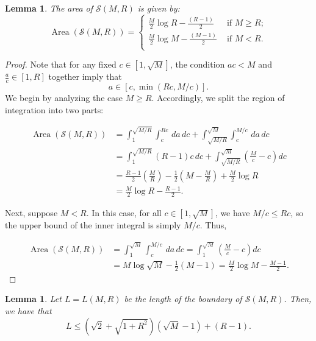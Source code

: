 \documentclass[table]{amsart}
\newtheorem{lemma}[theorem]{Lemma}
\newcommand{\op}[1]{\operatorname{#1}}
\numberwithin{equation}{section}
\begin{document}
\begin{lemma}\label{S(M,R) area lemma}
    The area of $\mathcal{S}(M, R)$ is given by: \[
\op{Area}\left(\mathcal{S}(M, R)\right)=\begin{cases}
 \frac{M}{2}\log R -\frac{(R-1)}{2} &\text{ if }M\geq R;\\
 \frac{M}{2}\log M-\frac{(M-1)}{2} & \text{ if }M<R.\\
\end{cases}\]
\end{lemma}
\begin{proof}Note that for any fixed $c \in [1, \sqrt{M}]$, the condition $ac < M$ and $\frac{a}{c} \in [1, R]$ together imply that
\[a \in \left[c, \min(Rc, M/c)\right].\]
\noindent We begin by analyzing the case $M \geq R$. Accordingly, we split the region of integration into two parts:

$$
\begin{aligned}
\operatorname{Area}(\mathcal{S}(M, R)) &= \int_{1}^{\sqrt{M/R}} \int_{c}^{Rc} \, da\, dc + \int_{\sqrt{M/R}}^{\sqrt{M}} \int_{c}^{M/c} \, da\, dc \\
&= \int_{1}^{\sqrt{M/R}} (R - 1)c \, dc + \int_{\sqrt{M/R}}^{\sqrt{M}} \left( \frac{M}{c} - c \right) dc \\
&= \frac{R - 1}{2} \left(\frac{M}{R}\right) - \frac{1}{2}\left(M - \frac{M}{R}\right) + \frac{M}{2} \log R \\
&= \frac{M}{2} \log R - \frac{R - 1}{2}.
\end{aligned}
$$

Next, suppose $M < R$. In this case, for all $c \in [1, \sqrt{M}]$, we have $M/c \leq Rc$, so the upper bound of the inner integral is simply $M/c$. Thus,

$$
\begin{aligned}
\operatorname{Area}(\mathcal{S}(M, R)) &= \int_{1}^{\sqrt{M}} \int_{c}^{M/c} \, da\, dc = \int_{1}^{\sqrt{M}} \left( \frac{M}{c} - c \right) dc \\
&= M \log \sqrt{M} - \frac{1}{2}(M - 1) = \frac{M}{2} \log M - \frac{M - 1}{2}.
\end{aligned}
$$
\end{proof}
\begin{lemma}\label{L computation lemma}
    Let $L=L(M, R)$ be the length of the boundary of $\mathcal{S}(M, R)$. Then, we have that
    \[L\leq \left(\sqrt{2}+\sqrt{1+R^2}\right)(\sqrt{M}-1)+(R-1).\]
\end{lemma}
\end{document}
